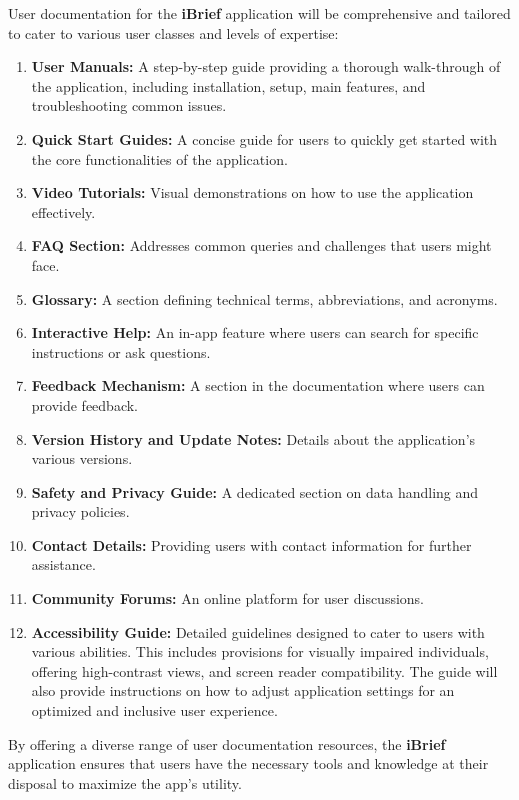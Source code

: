 User documentation for the \textbf{iBrief} application will be comprehensive and tailored to cater to various user classes and levels of expertise:

\begin{enumerate}
    \item \textbf{User Manuals:} A step-by-step guide providing a thorough walk-through of the application, including installation, setup, main features, and troubleshooting common issues.
    
    \item \textbf{Quick Start Guides:} A concise guide for users to quickly get started with the core functionalities of the application.
    
    \item \textbf{Video Tutorials:} Visual demonstrations on how to use the application effectively.
    
    \item \textbf{FAQ Section:} Addresses common queries and challenges that users might face.
    
    \item \textbf{Glossary:} A section defining technical terms, abbreviations, and acronyms.
    
    \item \textbf{Interactive Help:} An in-app feature where users can search for specific instructions or ask questions.
    
    \item \textbf{Feedback Mechanism:} A section in the documentation where users can provide feedback.
    
    \item \textbf{Version History and Update Notes:} Details about the application's various versions.

    \item \textbf{Safety and Privacy Guide:} A dedicated section on data handling and privacy policies.
    
    \item \textbf{Contact Details:} Providing users with contact information for further assistance.
    
    \item \textbf{Community Forums:} An online platform for user discussions.
    
    \item \textbf{Accessibility Guide:} Detailed guidelines designed to cater to users with various abilities. This includes provisions for visually impaired individuals, offering high-contrast views, and screen reader compatibility. The guide will also provide instructions on how to adjust application settings for an optimized and inclusive user experience.
\end{enumerate}

By offering a diverse range of user documentation resources, the \textbf{iBrief} application ensures that users have the necessary tools and knowledge at their disposal to maximize the app's utility.

